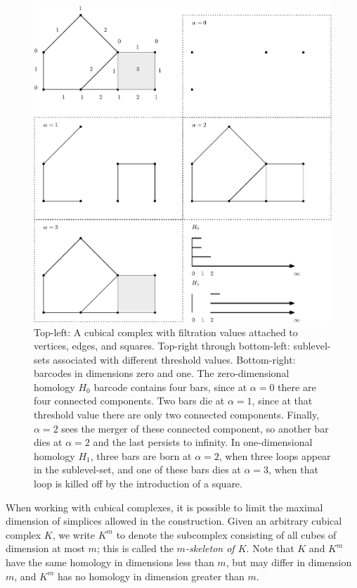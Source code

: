 \documentclass[conference]{IEEEtran}
\theoremstyle{definition}
\numberwithin{figure}{section}
\begin{document}
\begin{figure}
	\centering
	\includegraphics[scale=0.5]{cubpers.eps}
	\caption{Top-left: A cubical complex with filtration values attached to vertices, edges, and squares. Top-right through bottom-left: sublevel-sets associated with different threshold values. Bottom-right: barcodes in dimensions zero and one. The zero-dimensional homology $H_0$ barcode contains four bars, since at $\alpha=0$ there are four connected components. Two bars die at $\alpha=1$, since at that threshold value there are only two connected components. Finally, $\alpha=2$ sees the merger of these connected component, so another bar dies at $\alpha=2$ and the last persists to infinity. In one-dimensional homology $H_1$, three bars are born at $\alpha = 2$, when three loops appear in the sublevel-set, and one of these bars dies at $\alpha=3$, when that loop is killed off by the introduction of a square.}
	\label{fig:cubpers}
\end{figure}

When working with cubical complexes, it is possible to limit the maximal dimension of simplices allowed in the construction. Given an arbitrary cubical complex $K$, we write $K^m$ to denote the subcomplex consisting of all cubes of dimension at most $m$; this is called the \emph{$m$-skeleton of $K$}. Note that $K$ and $K^m$ have the same homology in dimensions less than $m$, but may differ in dimension $m$, and $K^m$ has no homology in dimension greater than $m$.
\end{document}
